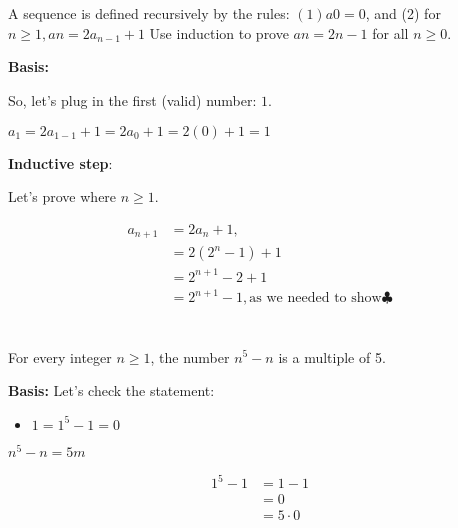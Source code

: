 \documentclass{article}
\begin{document}
\section{}
A sequence is defined recursively by the rules: $(1) a0 = 0$, and (2) for $n \ge 1, an = 2a_{n - 1} + 1$
Use induction to prove $an = 2n - 1$ for all $n \ge 0$.

\textbf{Basis:}

So, let's plug in the first (valid) number: $1$.

$a_{1} = 2a_{1-1} + 1 = 2a_0 + 1 = 2(0) + 1 = 1$

\textbf{Inductive step}:

Let's prove where $n \ge 1$.

\begin{align*}
a_{n+1} &= 2a_{n} + 1, \\
        &= 2(2^n-1) + 1 \\
        &= 2^{n+1} - 2 + 1 \\
        &= 2^{n+1} - 1, \text{as we needed to show} \clubsuit
\end{align*}

\newpage

\section{}

For every integer $n \ge 1$, the number $n^5 - n$ is a multiple of 5.

\textbf{Basis:} Let's check the statement:

\begin{itemize}
    \item[] $1 = 1^5 - 1 = 0$
\end{itemize}





$n^5 - n = 5m$

\begin{align*}
1^5 - 1 &= 1 - 1 \\
        &= 0 \\
        &= 5 \cdot 0 \\
\end{align*}
\end{document}
